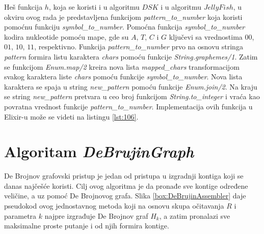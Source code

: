 \documentclass[12pt,oneside]{memoir}
\begin{document}

Heš funkcija $h$, koja se koristi i u algoritmu $DSK$ i u algoritmu $JellyFish$, u okviru ovog rada je predstavljena funkcijom \textit{pattern\_to\_number} koja koristi pomoćnu funkciju \textit{symbol\_to\_number}. Pomoćna funkcija \textit{symbol\_to\_number} kodira nukleotide pomoću mape, gde su $A$, $T$, $C$ i $G$ ključevi sa vrednostima $00$, $01$, $10$, $11$, respektivno. Funkcija \textit{pattern\_to\_number} prvo na osnovu stringa \textit{pattern} formira listu karaktera \textit{chars} pomoću funkcije \textit{String.graphemes/1}. Zatim se funkcijom \textit{Enum.map/2} kreira nova lista \textit{mapped\_chars} transformacijom svakog karaktera liste \textit{chars} pomoću funkcije \textit{symbol\_to\_number}. Nova lista karaktera se spaja u string \textit{new\_pattern} pomoću funkcije \textit{Enum.join/2}. Na kraju se string \textit{new\_pattern} pretvara u ceo broj funkcijom \textit{String.to\_integer} i vraća kao povratna vrednost funkcije \textit{pattern\_to\_number}. Implementacija ovih funkcija u Elixir-u može se videti na listingu \ref{lst:106}.

\newpage



\section{Algoritam \textit{DeBrujinGraph}}
\label{odeljak:ImplementacijaDB}

De Brojnov grafovski pristup je jedan od pristupa u izgradnji kontiga koji se danas najčešće koristi. Cilj ovog algoritma je da pronađe sve kontige određene veličine, a uz pomoć De Brojnovog grafa. Slika \ref{box:DeBrujinAssembler} daje pseudokod ovog jednostavnog metoda koji na osnovu skupa očitavanja $R$ i parametra $k$ najpre izgrađuje De Brojnov graf $H_k$, a zatim pronalazi sve maksimalne proste putanje i od njih formira kontige.

\begin{comment}

\begin{figure}[!ht]
\centering
\texttt{[image: Figura5\_17.PNG]}
\caption{Jednostavan De Brojnov grafovski asembler \cite{WingKinSung}}
\label{fig:11}
\end{figure}

\end{comment}
\end{document}
